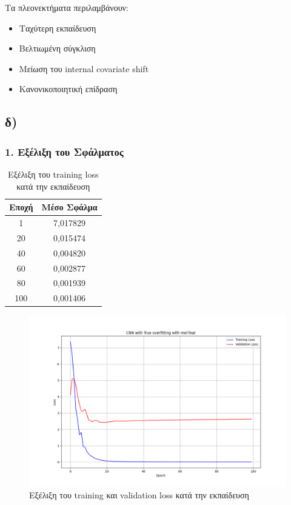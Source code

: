 \documentclass[a4paper,12pt]{article}
\begin{document}
Τα πλεονεκτήματα περιλαμβάνουν:
\begin{itemize}
    \item Ταχύτερη εκπαίδευση
    \item Βελτιωμένη σύγκλιση
    \item Μείωση του internal covariate shift
    \item Κανονικοποιητική επίδραση
\end{itemize}

\subsection*{δ)}

\subsubsection*{1. Εξέλιξη του Σφάλματος}
\begin{table}[h]
    \centering
    \begin{tabular}{cc}
    \toprule
    \textbf{Εποχή} & \textbf{Μέσο Σφάλμα} \\
    \midrule
    1 & 7,017829 \\
    20 & 0,015474 \\
    40 & 0,004820 \\
    60 & 0,002877 \\
    80 & 0,001939 \\
    100 & 0,001406 \\
    \bottomrule
    \end{tabular}
    \caption{Εξέλιξη του training loss κατά την εκπαίδευση}
\end{table}

\begin{figure}[h!]
    \centering
    \includegraphics[width=\textwidth]{images/CNN with True overfitting with mel feat.png}
    \caption{Εξέλιξη του training και validation loss κατά την εκπαίδευση}
    \label{fig:error_evolution}
\end{figure}
\end{document}
